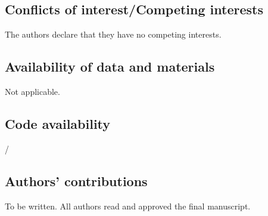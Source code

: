 \documentclass[10pt]{article}
\theoremstyle{plain}
\theoremstyle{definition}
\theoremstyle{remark}
\begin{document}
\subsection*{Conflicts of interest/Competing interests}
The authors declare that they have no competing interests.

\subsection*{Availability of data and materials}
Not applicable.

\subsection*{Code availability}
/

\subsection*{Authors' contributions}
To be written.  All authors read and approved the final manuscript.


\end{document}

